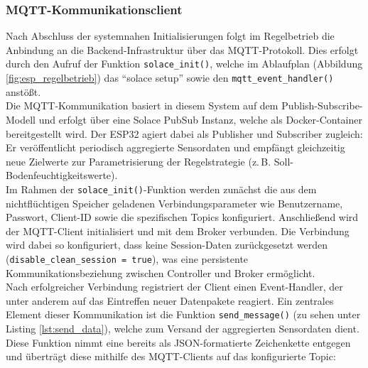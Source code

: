 \subsubsection{MQTT-Kommunikationsclient}

Nach Abschluss der systemnahen Initialisierungen folgt im Regelbetrieb die Anbindung an die Backend-Infrastruktur über das MQTT-Protokoll. Dies erfolgt durch den Aufruf der Funktion \texttt{solace\_init()}, welche im Ablaufplan (Abbildung \vref{fig:esp_regelbetrieb}) das \enquote{solace setup} sowie den \texttt{mqtt\_event\_handler()} anstößt.
\\
Die MQTT-Kommunikation basiert in diesem System auf dem Publish-Subscribe-Modell und erfolgt über eine Solace PubSub Instanz, welche als Docker-Container bereitgestellt wird. Der ESP32 agiert dabei als Publisher und Subscriber zugleich: Er veröffentlicht periodisch aggregierte Sensordaten und empfängt gleichzeitig neue Zielwerte zur Parametrisierung der Regelstrategie (z.\,B. Soll-Bodenfeuchtigkeitswerte).
\\
Im Rahmen der \texttt{solace\_init()}-Funktion werden zunächst die aus dem nichtflüchtigen Speicher geladenen Verbindungsparameter wie Benutzername, Passwort, Client-ID sowie die spezifischen Topics konfiguriert. Anschließend wird der MQTT-Client initialisiert und mit dem Broker verbunden. Die Verbindung wird dabei so konfiguriert, dass keine Session-Daten zurückgesetzt werden (\texttt{disable\_clean\_session = true}), was eine persistente Kommunikationsbeziehung zwischen Controller und Broker ermöglicht.
\\
Nach erfolgreicher Verbindung registriert der Client einen Event-Handler, der unter anderem auf das Eintreffen neuer Datenpakete reagiert. Ein zentrales Element dieser Kommunikation ist die Funktion \texttt{send\_message()} (zu sehen unter Listing \vref{lst:send_data}), welche zum Versand der aggregierten Sensordaten dient. Diese Funktion nimmt eine bereits als JSON-formatierte Zeichenkette entgegen und überträgt diese mithilfe des MQTT-Clients auf das konfigurierte Topic:
\\

